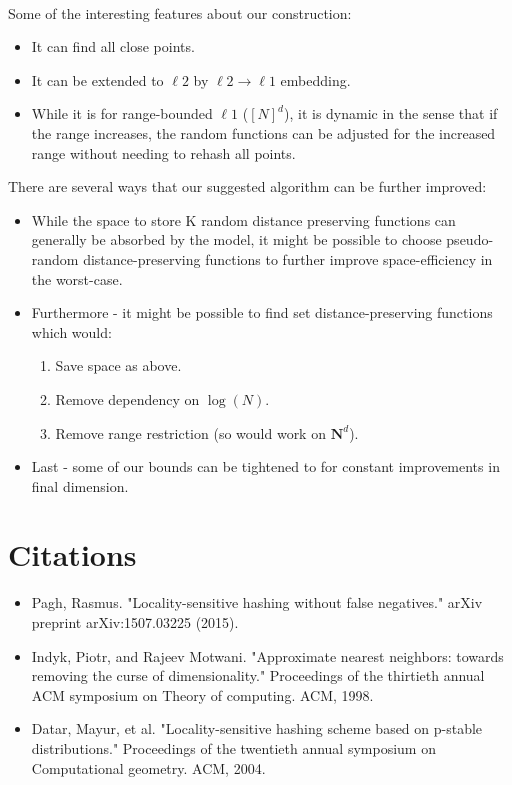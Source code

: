 \documentclass{scrartcl}
\newcommand{\N}{{\mathbf{N}}}
\begin{document}
\paragraph{}
Some of the interesting features about our construction:
\begin{itemize}
	\item It can find all close points.
	\item It can be extended to $\ell2$ by $\ell2 \rightarrow \ell1$ embedding.
	\item While it is for range-bounded $\ell1$ ($[N]^d$), it is dynamic in the sense that if the range increases, the random functions can be adjusted for the increased range without needing to rehash all points.
\end{itemize}
There are several ways that our suggested algorithm can be further improved:
\begin{itemize}
	\item While the space to store K random distance preserving functions can generally be absorbed by the model, it might be possible to choose pseudo-random distance-preserving functions to further improve space-efficiency in the worst-case.
	\item Furthermore - it might be possible to find  set distance-preserving functions which would:
		\begin{enumerate}
			\item Save space as above.
			\item Remove dependency on $\log(N)$.
			\item Remove range restriction (so would work on $\N^d$).
		\end{enumerate}
	\item Last - some of our bounds can be tightened to for constant improvements in final dimension.
\end{itemize}


\section{Citations}
\begin{itemize}
    \item Pagh, Rasmus. "Locality-sensitive hashing without false negatives." arXiv preprint arXiv:1507.03225 (2015).
    \item Indyk, Piotr, and Rajeev Motwani. "Approximate nearest neighbors: towards removing the curse of dimensionality." Proceedings of the thirtieth annual ACM symposium on Theory of computing. ACM, 1998.
    \item Datar, Mayur, et al. "Locality-sensitive hashing scheme based on p-stable distributions." Proceedings of the twentieth annual symposium on Computational geometry. ACM, 2004.
\end{itemize}


\FloatBarrier
\end{document}
